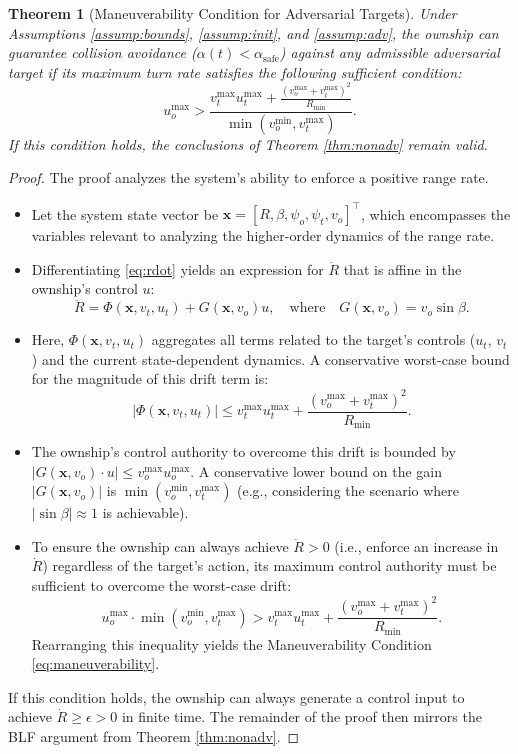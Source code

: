 \documentclass[10pt]{article}
\theoremstyle{plain}
\newtheorem{theorem}{Theorem}
\begin{document}
\begin{theorem}[Maneuverability Condition for Adversarial Targets]\label{thm:adv}
    Under Assumptions \ref{assump:bounds}, \ref{assump:init}, and \ref{assump:adv}, the ownship can guarantee collision avoidance ($\alpha(t) < \alpha_{\text{safe}}$) against any admissible adversarial target if its maximum turn rate satisfies the following sufficient condition:
    \begin{equation}\label{eq:maneuverability}
        u_o^{\max} > \frac{v_t^{\max} u_t^{\max} + \frac{(v_o^{\max} + v_t^{\max})^2}{R_{\text{min}}}}{\min(v_o^{\min}, v_t^{\max})}.
    \end{equation}
    If this condition holds, the conclusions of Theorem \ref{thm:nonadv} remain valid.
\end{theorem}

\begin{proof}
    The proof analyzes the system's ability to enforce a positive range rate.
    \begin{itemize}
        \item Let the system state vector be $\mathbf{x} = [R, \beta, \psi_o, \psi_t, v_o]^\intercal$, which encompasses the variables relevant to analyzing the higher-order dynamics of the range rate.
        \item Differentiating \eqref{eq:rdot} yields an expression for $\ddot{R}$ that is affine in the ownship's control $u$:
        \[
        \ddot{R} = \Phi(\mathbf{x}, v_t, u_t) + G(\mathbf{x}, v_o) u, \quad \text{where} \quad G(\mathbf{x}, v_o) = v_o \sin\beta.
        \]
    \item Here, $\Phi(\mathbf{x}, v_t, u_t)$ aggregates all terms related to the target's controls ($u_t$, $v_t$) and the current state-dependent dynamics. A conservative worst-case bound for the magnitude of this drift term is:
    \[
    |\Phi(\mathbf{x}, v_t, u_t)| \leq v_t^{\max} u_t^{\max} + \frac{(v_o^{\max} + v_t^{\max})^2}{R_{\text{min}}}.
    \]
        \item The ownship's control authority to overcome this drift is bounded by $|G(\mathbf{x}, v_o) \cdot u| \leq v_o^{\max} u_o^{\max}$. A conservative lower bound on the gain $|G(\mathbf{x}, v_o)|$ is $\min(v_o^{\min}, v_t^{\max})$ (e.g., considering the scenario where $|\sin\beta| \approx 1$ is achievable).
    \item To ensure the ownship can always achieve $\ddot{R} > 0$ (i.e., enforce an increase in $\dot{R}$) regardless of the target's action, its maximum control authority must be sufficient to overcome the worst-case drift:
    \[
    u_o^{\max} \cdot \min(v_o^{\min}, v_t^{\max}) > v_t^{\max} u_t^{\max} + \frac{(v_o^{\max} + v_t^{\max})^2}{R_{\text{min}}}.
    \]
        Rearranging this inequality yields the Maneuverability Condition \eqref{eq:maneuverability}.
    \end{itemize}
    If this condition holds, the ownship can always generate a control input to achieve $\dot{R} \geq \epsilon > 0$ in finite time. The remainder of the proof then mirrors the BLF argument from Theorem \ref{thm:nonadv}.
\end{proof}
\end{document}
